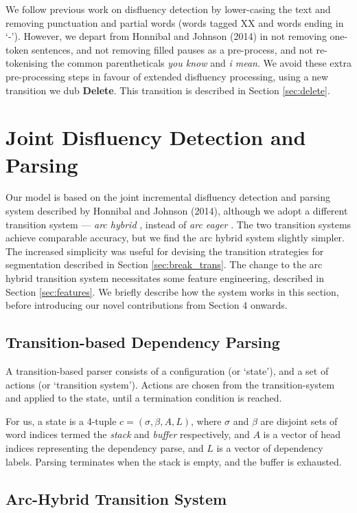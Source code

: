 \documentclass[11pt,letterpaper]{article}
\begin{document}
We follow previous work on disfluency detection by lower-casing the text and
removing punctuation and partial words (words tagged XX and words ending in
`-').  However, we depart from Honnibal and Johnson (2014) in not removing one-token
sentences, and not removing filled pauses as a pre-process, and not
re-tokenising the common parentheticals \emph{you know} and \emph{i mean}.
We avoid these extra pre-processing steps in favour of extended disfluency processing,
using a new transition we dub \textbf{Delete}.  This transition is described in
Section \ref{sec:delete}.

\section{Joint Disfluency Detection and Parsing}

Our model is based on the joint incremental disfluency detection and parsing
system described by Honnibal and Johnson (2014), although we adopt a different
transition system --- \emph{arc hybrid} \citep{kuhlmann:11}, instead of
\emph{arc eager} \citep{nivre:03}.  The two transition systems achieve comparable
accuracy, but we find the arc hybrid system slightly simpler.  The increased
simplicity was useful for devising the transition strategies for segmentation
described in Section \ref{sec:break_trans}.  The change to the arc hybrid
transition system necessitates some feature engineering, described in Section
\ref{sec:features}.
We briefly describe how the system works in this section, before introducing our
novel contributions from Section 4 onwards.

\subsection{Transition-based Dependency Parsing}

A transition-based parser consists of a configuration (or `state'), and a set
of actions (or `transition system').  Actions are chosen from the transition-system
and applied to the state, until a termination condition is reached.

For us, a state is a 4-tuple $c = (\sigma, \beta, A, L)$, where $\sigma$ and $\beta$
are disjoint sets of word indices termed the \emph{stack} and \emph{buffer}
respectively, and $A$ is a vector of head indices representing the dependency parse,
and $L$ is a vector of dependency labels.  Parsing terminates when the stack is
empty, and the buffer is exhausted.

\subsection{Arc-Hybrid Transition System}
\end{document}
